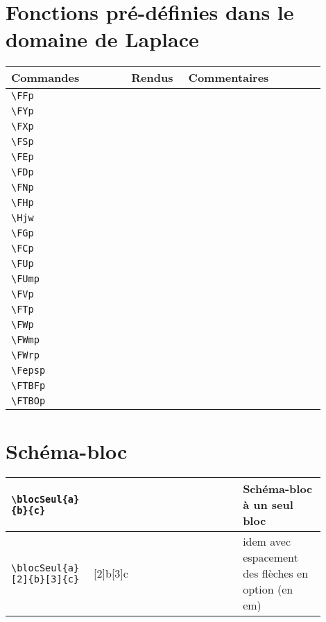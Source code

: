 \documentclass[a4paper,12pt]{article}
\begin{document}
	
	
	\section{Fonctions pré-définies dans le domaine de Laplace}

	\begin{tabular}{|p{0.35\linewidth}|p{0.15\linewidth}|p{0.4\linewidth}|}
		\hline
			\textbf{Commandes}&\textbf{Rendus}&\textbf{Commentaires}
		\\\hline\hline
			\verb!\FFp!	&	\FFp &	
		\\\hline
			\verb!\FYp!	&	\FYp &	
		\\\hline
			\verb!\FXp!	&	\FXp &	
		\\\hline
			\verb!\FSp!	&	\FSp &	
		\\\hline
			\verb!\FEp!	&	\FEp &	
		\\\hline
			\verb!\FDp!	&	\FDp &	
		\\\hline
			\verb!\FNp!	&	\FNp &	
		\\\hline
			\verb!\FHp!	&	\FHp &	
		\\\hline
			\verb!\Hjw!	&	\Hjw &	
		\\\hline
			\verb!\FGp!	&	\FGp &	
		\\\hline
			\verb!\FCp!	&	\FCp &	
		\\\hline
			\verb!\FUp!	&	\FUp &	
		\\\hline
			\verb!\FUmp!	&	\FUmp &	
		\\\hline
			\verb!\FVp!	&	\FVp &	
		\\\hline
			\verb!\FTp!	&	\FTp &	
		\\\hline
			\verb!\FWp!	&	\FWp &	
		\\\hline
			\verb!\FWmp!	&	\FWmp &	
		\\\hline
			\verb!\FWrp!	&	\FWrp &	
		\\\hline
			\verb!\Fepsp!	&	\Fepsp &	
		\\\hline
			\verb!\FTBFp!	&	\FTBFp &	
		\\\hline
			\verb!\FTBOp!	&	\FTBOp &	
		\\\hline
	\end{tabular}
		
	\section{Schéma-bloc}
	
	\noindent
	\begin{tabular}{|p{0.20\linewidth}|p{0.45\linewidth}|p{0.25\linewidth}|}
		\hline
			\verb!\blocSeul{a}! \verb!{b}{c}!	&	\blocSeul{a}{b}{c} &	Schéma-bloc à un seul bloc
		\\\hline
			\verb!\blocSeul{a}! \verb![2]{b}[3]{c}!	&	\blocSeul{a}[2]{b}[3]{c} &	idem avec espacement des flèches en option (en em)
		\\\hline
	\end{tabular}
	
\end{document}
